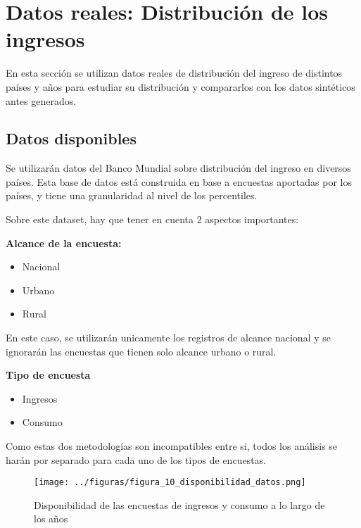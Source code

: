 \chapter{Datos reales: Distribución de los ingresos} \label{chapter:datos_reales_distribucion}

En esta sección se utilizan datos reales de distribución del ingreso de distintos países y años para estudiar su distribución y compararlos con los datos sintéticos antes generados.

\section{Datos disponibles}

Se utilizarán datos del Banco Mundial \cite{income_distribution_dataset} sobre distribución del ingreso en diversos países. Esta base de datos está construida en base a encuestas aportadas por los países, y tiene una granularidad al nivel de los percentiles.
    
Sobre este dataset, hay que tener en cuenta 2 aspectos importantes:

\textbf{Alcance de la encuesta:}

\begin{itemize}
    \item Nacional
    \item Urbano
    \item Rural
\end{itemize}

En este caso, se utilizarán unicamente los registros de alcance nacional y se ignorarán las encuestas que tienen solo alcance urbano o rural.

\textbf{Tipo de encuesta}

\begin{itemize}
    \item Ingresos
    \item Consumo
\end{itemize}

Como estas dos metodologías son incompatibles entre si, todos los análisis se harán por separado para cada uno de los tipos de encuestas.

\begin{figure}[H] %
    \centering %
    \texttt{[image: ../figuras/figura\_10\_disponibilidad\_datos.png]} %
    \caption{Disponibilidad de las encuestas de ingresos y consumo a lo largo de los años}
    \label{fig:10} %
\end{figure}

